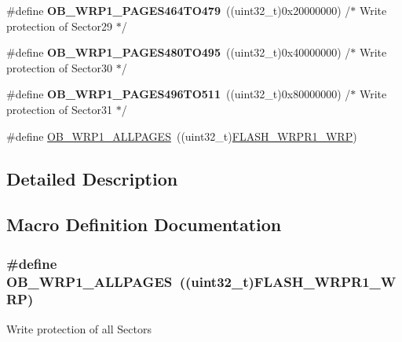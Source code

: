 \begin{DoxyCompactItemize}
\item 
\hypertarget{group___f_l_a_s_h_ex___option___bytes___write___protection1_gaa9ee5ab65aee13f1a4c55f96f85fe1e6}{\#define {\bfseries O\-B\-\_\-\-W\-R\-P1\-\_\-\-P\-A\-G\-E\-S464\-T\-O479}~((uint32\-\_\-t)0x20000000) /$\ast$ Write protection of Sector29 $\ast$/}\label{group___f_l_a_s_h_ex___option___bytes___write___protection1_gaa9ee5ab65aee13f1a4c55f96f85fe1e6}

\item 
\hypertarget{group___f_l_a_s_h_ex___option___bytes___write___protection1_gaf6e7ec6a3e9a0b471275673e4a17362e}{\#define {\bfseries O\-B\-\_\-\-W\-R\-P1\-\_\-\-P\-A\-G\-E\-S480\-T\-O495}~((uint32\-\_\-t)0x40000000) /$\ast$ Write protection of Sector30 $\ast$/}\label{group___f_l_a_s_h_ex___option___bytes___write___protection1_gaf6e7ec6a3e9a0b471275673e4a17362e}

\item 
\hypertarget{group___f_l_a_s_h_ex___option___bytes___write___protection1_ga5557c78d7304a1a2f469167c2a7959d6}{\#define {\bfseries O\-B\-\_\-\-W\-R\-P1\-\_\-\-P\-A\-G\-E\-S496\-T\-O511}~((uint32\-\_\-t)0x80000000) /$\ast$ Write protection of Sector31 $\ast$/}\label{group___f_l_a_s_h_ex___option___bytes___write___protection1_ga5557c78d7304a1a2f469167c2a7959d6}

\item 
\#define \hyperlink{group___f_l_a_s_h_ex___option___bytes___write___protection1_gab270339eea70e4f316a4ef4bb790e9d4}{O\-B\-\_\-\-W\-R\-P1\-\_\-\-A\-L\-L\-P\-A\-G\-E\-S}~((uint32\-\_\-t)\hyperlink{group___peripheral___registers___bits___definition_gae679750359efe8ad28dabb98d5f2b849}{F\-L\-A\-S\-H\-\_\-\-W\-R\-P\-R1\-\_\-\-W\-R\-P})
\end{DoxyCompactItemize}


\subsection{Detailed Description}


\subsection{Macro Definition Documentation}
\hypertarget{group___f_l_a_s_h_ex___option___bytes___write___protection1_gab270339eea70e4f316a4ef4bb790e9d4}{
\subsubsection[{O\-B\-\_\-\-W\-R\-P1\-\_\-\-A\-L\-L\-P\-A\-G\-E\-S}]{\setlength{\rightskip}{0pt plus 5cm}\#define O\-B\-\_\-\-W\-R\-P1\-\_\-\-A\-L\-L\-P\-A\-G\-E\-S~((uint32\-\_\-t){\bf F\-L\-A\-S\-H\-\_\-\-W\-R\-P\-R1\-\_\-\-W\-R\-P})}}\label{group___f_l_a_s_h_ex___option___bytes___write___protection1_gab270339eea70e4f316a4ef4bb790e9d4}
Write protection of all Sectors 